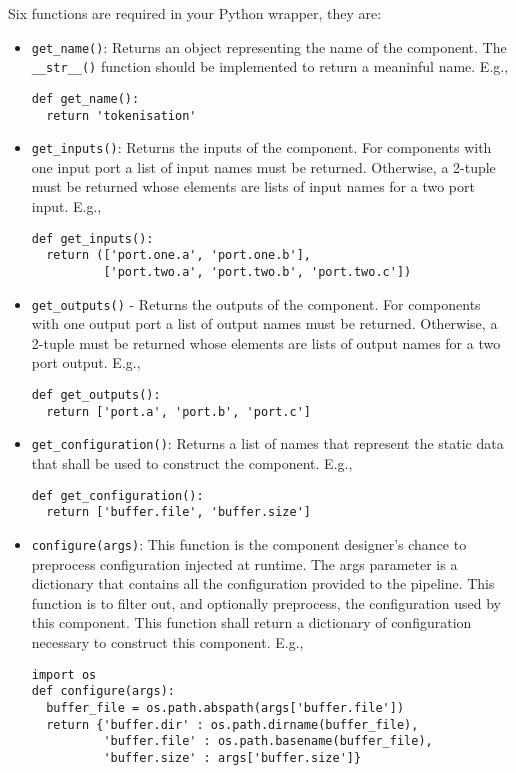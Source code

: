 Six functions are required in your Python wrapper, they are:
\begin{itemize}
\item \texttt{get\_name()}: Returns an object representing the name of the component. The \texttt{\_\_str\_\_()} function should be implemented to return a meaninful name. E.g.,
\begin{verbatim}
def get_name():
  return 'tokenisation'
\end{verbatim}
\item \texttt{get\_inputs()}: Returns the inputs of the component. For components with one input port a list of input names must be returned. Otherwise, a 2-tuple must be returned whose elements are lists of input names for a two port input. E.g.,
\begin{verbatim}
def get_inputs():
  return (['port.one.a', 'port.one.b'],
          ['port.two.a', 'port.two.b', 'port.two.c'])
\end{verbatim}
\item \texttt{get\_outputs()} - Returns the outputs of the component. For components with one output port a list of output names must be returned. Otherwise, a 2-tuple must be returned whose elements are lists of output names for a two port output. E.g.,
\begin{verbatim}
def get_outputs():
  return ['port.a', 'port.b', 'port.c']
\end{verbatim}
\item \texttt{get\_configuration()}: Returns a list of names that represent the static data that shall be used to construct the component. E.g.,
\begin{verbatim}
def get_configuration():
  return ['buffer.file', 'buffer.size']
\end{verbatim}
\item \texttt{configure(args)}: This function is the component designer's chance to preprocess configuration injected at runtime. The args parameter is a dictionary that contains all the configuration provided to the pipeline. This function is to filter out, and optionally preprocess, the configuration used by this component. This function shall return a dictionary of configuration necessary to construct this component. E.g.,
\begin{verbatim}
import os
def configure(args):
  buffer_file = os.path.abspath(args['buffer.file'])
  return {'buffer.dir' : os.path.dirname(buffer_file),
          'buffer.file' : os.path.basename(buffer_file),
          'buffer.size' : args['buffer.size']}
\end{verbatim}

\end{itemize}

